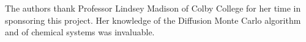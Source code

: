 \documentclass[journal=jacsat,manuscript=article]{achemso}
\begin{document}
\begin{acknowledgement}
%
%
%
The authors thank Professor Lindsey Madison of Colby College for her time in sponsoring this project. Her knowledge of the Diffusion Monte Carlo algorithm and of chemical systems was invaluable. 
\end{acknowledgement}
%
%
%
%
%

\end{document}
